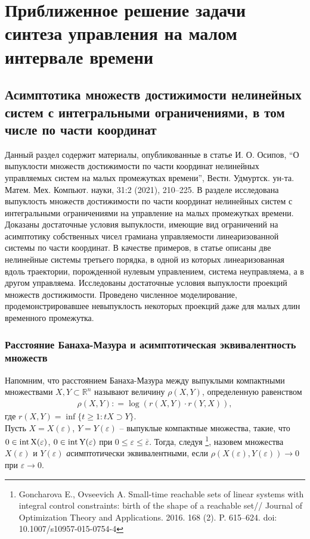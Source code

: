 \documentclass[../main.tex]{subfiles}
\begin{document}
\newpage
\section{Приближенное решение задачи синтеза управления на малом интервале времени}
\subsection{Асимптотика множеств достижимости нелинейных систем с интегральными ограничениями, в том числе по части координат} 
Данный раздел содержит материалы, опубликованные в статье И. О. Осипов, “О выпуклости множеств достижимости по части координат нелинейных управляемых систем на малых промежутках времени”, Вестн. Удмуртск. ун-та. Матем. Мех. Компьют. науки, 31:2 (2021),  210–225. В разделе исследована выпуклость множеств достижимости по части координат нелинейных систем с интегральными ограничениями на управление на малых промежутках времени.
Доказаны достаточные условия выпуклости, имеющие вид ограничений на асимптотику собственных чисел грамиана управляемости линеаризованной системы по части координат.
В качестве примеров, в статье описаны две нелинейные системы третьего порядка, в одной из которых линеаризованная вдоль траектории, порожденной нулевым управлением, система неуправляема, а в другом управляема.
Исследованы достаточные условия выпуклости проекций множеств достижимости. 
Проведено численное моделирование, продемонстрировавшее невыпуклость некоторых проекций даже для малых длин временного промежутка.
\subsubsection{Расстояние Банаха-Мазура и асимптотическая эквивалентность множеств}
Напомним, что расстоянием Банаха-Мазура между выпуклыми компактными множествами $ X,Y \subset \mathbb R^n $ называют величину $ \rho (X, Y)  $, определенную равенством 
\begin{gather*}
	\rho (X, Y): = \log (r(X,Y) \cdot r(Y, X)),
\end{gather*}
где $r(X, Y) = \inf \{t \geq 1: tX \supset Y \}$.\\
Пусть $ X = X(\varepsilon) $,  $ Y = Y(\varepsilon) $ -- выпуклые компактные множества, такие, что $ 0 \in \rm{int}\,X(\varepsilon) $, $ 0 \in \rm{int}\,Y(\varepsilon) $ при $0 \leqslant \varepsilon \leqslant \overline{\varepsilon} $.  Тогда, следуя \footnote{Goncharova E., Ovseevich A. Small-time reachable sets of linear systems with integral control constraints: birth of the shape of a reachable set// Journal of Optimization Theory and Applications. 2016. 168 (2). P. 615--624.
	doi: 10.1007/s10957-015-0754-4}, назовем множества $  X(\varepsilon)  $ и $  Y(\varepsilon) $ {\textit асимптотически эквивалентными}, если $  \rho (X(\varepsilon), Y(\varepsilon)) \rightarrow 0 $ при $\varepsilon \rightarrow 0 $.
\end{document}
